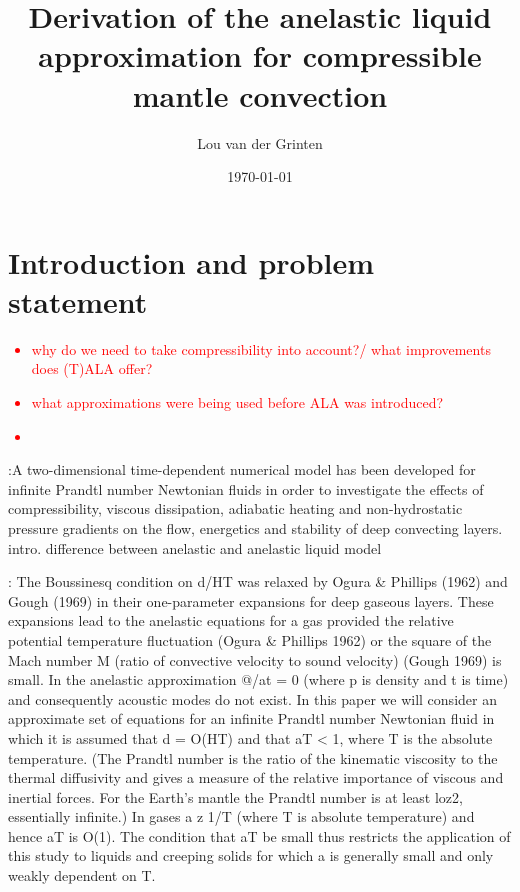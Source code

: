 \documentclass[a4paper]{article}
\title{Derivation of the anelastic liquid approximation for compressible mantle convection}
\author{Lou van der Grinten}
\date{\today}
\begin{document}
\maketitle
\newpage
\tableofcontents
\newpage

\section{Introduction and problem statement}
\textcolor{red}{\begin{itemize}
    \item why do we need to take compressibility into account?/ what improvements does (T)ALA offer? 
    \item what approximations were being used before ALA was introduced? 
    \item 
\end{itemize}}
\cite{jamc80}:A two-dimensional time-dependent numerical model has been developed for infinite
Prandtl number Newtonian fluids in order to investigate the effects of compressibility,
viscous dissipation, adiabatic heating and non-hydrostatic pressure gradients on the
flow, energetics and stability of deep convecting layers.
\cite{cudu19} intro. difference between anelastic and anelastic liquid model

\textcite{jamc80}: The Boussinesq condition on d/HT was relaxed by Ogura \& Phillips (1962) and
Gough (1969) in their one-parameter expansions for deep gaseous layers. These expansions
lead to the anelastic equations for a gas provided the relative potential
temperature fluctuation (Ogura \& Phillips 1962) or the square of the Mach number
M (ratio of convective velocity to sound velocity) (Gough 1969) is small. In the
anelastic approximation @/at = 0 (where p is density and t is time) and consequently
acoustic modes do not exist. In this paper we will consider an approximate set of equations for an infinite
Prandtl number Newtonian fluid in which it is assumed that d = O(HT) and that
aT < 1, where T is the absolute temperature. (The Prandtl number is the ratio of the
kinematic viscosity to the thermal diffusivity and gives a measure of the relative
importance of viscous and inertial forces. For the Earth’s mantle the Prandtl number
is at least loz2, essentially infinite.) In gases a z 1/T (where T is absolute temperature) and hence aT is O(1). 
The condition that aT be small thus restricts the application
of this study to liquids and creeping solids for which a is generally small and only
weakly dependent on T.
\end{document}
